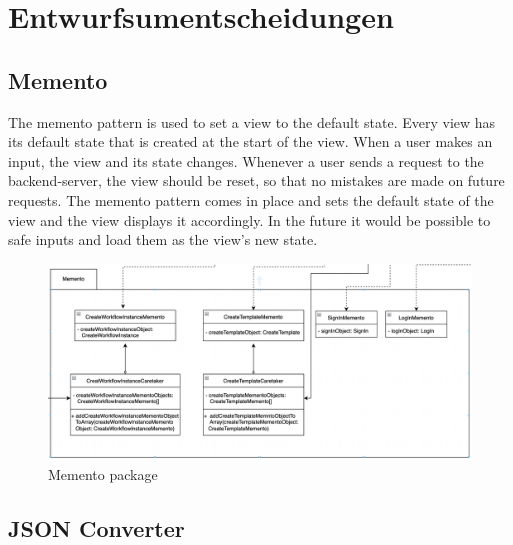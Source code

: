 \section{Entwurfsumentscheidungen}
    	
  
\subsection{Memento} 	
    	 The memento pattern is used to set a view to the default state. Every view has its default
    	 state that is created at the start of the view. When a user makes an input, the view and
    	 its state changes. Whenever a user sends a request to the backend-server, the view should
    	 be reset, so that no mistakes are made on future requests. The memento pattern comes in
    	 place and sets the default state of the view and the view displays it accordingly. In
    	 the future it would be possible to safe inputs and load them as the view's new state.
    	\begin{figure}[H]
            \label{API}
            \centerline{\includegraphics[scale=0.5]{res/Memento.png}}
            \caption{Memento package}
    	\end{figure}
    	\newpage
    	
\subsection{JSON Converter}

